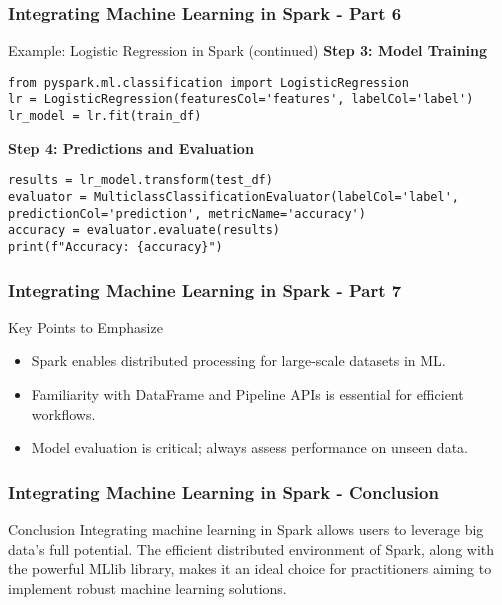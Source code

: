 \documentclass[aspectratio=169]{beamer}
\begin{document}
\begin{frame}[fragile]
    \frametitle{Integrating Machine Learning in Spark - Part 6}
    \begin{block}{Example: Logistic Regression in Spark (continued)}
        \textbf{Step 3: Model Training}
        \begin{lstlisting}
from pyspark.ml.classification import LogisticRegression
lr = LogisticRegression(featuresCol='features', labelCol='label')
lr_model = lr.fit(train_df)
        \end{lstlisting}
        
        \textbf{Step 4: Predictions and Evaluation}
        \begin{lstlisting}
results = lr_model.transform(test_df)
evaluator = MulticlassClassificationEvaluator(labelCol='label', predictionCol='prediction', metricName='accuracy')
accuracy = evaluator.evaluate(results)
print(f"Accuracy: {accuracy}")
        \end{lstlisting}
    \end{block}
\end{frame}

\begin{frame}[fragile]
    \frametitle{Integrating Machine Learning in Spark - Part 7}
    \begin{block}{Key Points to Emphasize}
        \begin{itemize}
            \item Spark enables distributed processing for large-scale datasets in ML.
            \item Familiarity with DataFrame and Pipeline APIs is essential for efficient workflows.
            \item Model evaluation is critical; always assess performance on unseen data.
        \end{itemize}
    \end{block}
\end{frame}

\begin{frame}[fragile]
    \frametitle{Integrating Machine Learning in Spark - Conclusion}
    \begin{block}{Conclusion}
        Integrating machine learning in Spark allows users to leverage big data's full potential. The efficient distributed environment of Spark, along with the powerful MLlib library, makes it an ideal choice for practitioners aiming to implement robust machine learning solutions.
    \end{block}
\end{frame}
\end{document}
